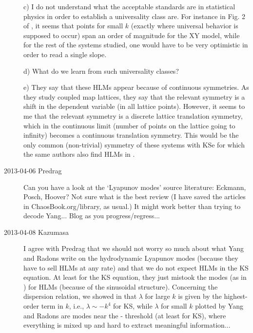 \begin{description}
c) I do not understand what the acceptable standards are in statistical physics in order to
establish a universality class are. For instance in Fig. 2 of , it seems that
points for small $k$ (exactly where universal behavior is supposed to occur) span an order of
magnitude for the XY model, while for the rest of the systems studied, one would have to be
very optimistic in order to read a single slope.

d) What do we learn from such universality classes?

e) They say that these HLMs appear because of continuous symmetries. As they study
coupled map lattices, they say that the relevant symmetry is a shift in the dependent
variable (in all lattice points). However, it seems to me that the relevant symmetry is
a discrete lattice translation symmetry, which in the continuous limit (number of points
on the lattice going to infinity) becomes a continuous translation symmetry. This would
be the only common (non-trivial) symmetry of these systems with KSe for which the same authors
also find HLMs in .

\item[2013-04-06 Predrag] Can you have a look at the `Lyapunov modes'
source literature: Eckmann, Posch,
 {Hoover}? Not sure what is the best
review (I have saved the articles in ChaosBook.org/library, as
usual.) It might work better than trying to decode Yang... Blog as
you progress/regress...


\item[2013-04-08 Kazumasa]
I agree with Predrag that we should not worry so much
 about what Yang and Radons write on the hydrodynamic Lyapunov modes
 (because they have to sell HLMs at any rate)
 and that we do not expect HLMs in the KS equation.
At least for the KS equation,
 they just mistook the {\transient} modes (as in ) for HLMs
 (because of the sinusoidal structure).
Concerning the dispersion relation, we showed
 in  that
 $\lambda$ for large $k$ is given by the highest-order term in $k$,
 i.e., $\lambda \sim -k^4$ for KS,
 while $\lambda$ for small $k$ plotted by Yang and Radons are
 modes near the {\entangled}-{\transient} threshold (at least for KS),
 where everything is mixed up and hard to extract meaningful information...


\end{description}
